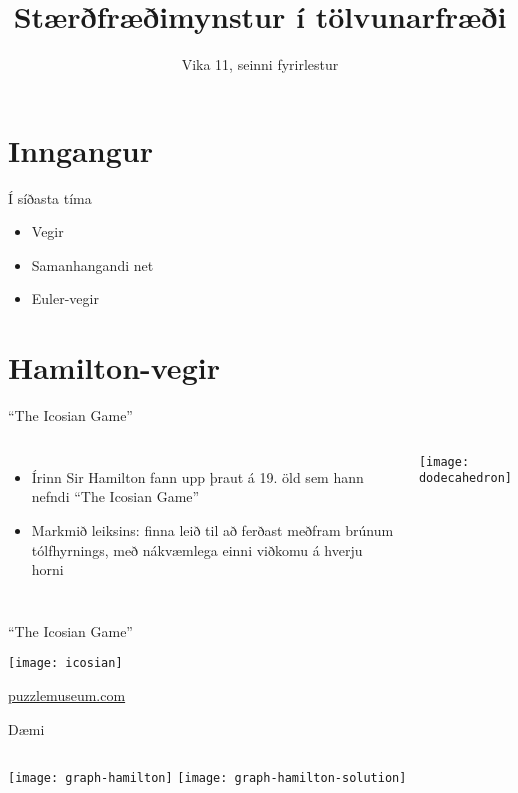 \documentclass[handout]{beamer}
\title{Stærðfræðimynstur í tölvunarfræði}
\subtitle{Vika 11, seinni fyrirlestur}
\begin{document}
\begin{frame}
\titlepage
\end{frame}


\section{Inngangur}

\begin{frame}{Í síðasta tíma}
\begin{itemize}
 \item Vegir 
 \item Samanhangandi net
 \item Euler-vegir
\end{itemize}
\end{frame}

\section{Hamilton-vegir}

\begin{frame}{``The Icosian Game''}
    \begin{columns}
        \begin{itemize}
            \item Írinn Sir Hamilton fann upp þraut á 19. öld sem hann nefndi ``The Icosian Game''
            \item Markmið leiksins: finna leið til að ferðast meðfram brúnum tólfhyrnings, með nákvæmlega einni viðkomu á hverju horni
        \end{itemize}
        \texttt{[image: dodecahedron]}
    \end{columns}
\end{frame}

\begin{frame}{``The Icosian Game''}
    \begin{center}
        \texttt{[image: icosian]}

        \href{http://puzzlemuseum.com/month/picm02/200207icosian.htm}{puzzlemuseum.com}
    \end{center}
\end{frame}

\begin{frame}{Dæmi}
\begin{columns}
\texttt{[image: graph-hamilton]}
\pause
{}
\texttt{[image: graph-hamilton-solution]}
\end{columns}
\end{frame}
\end{document}
